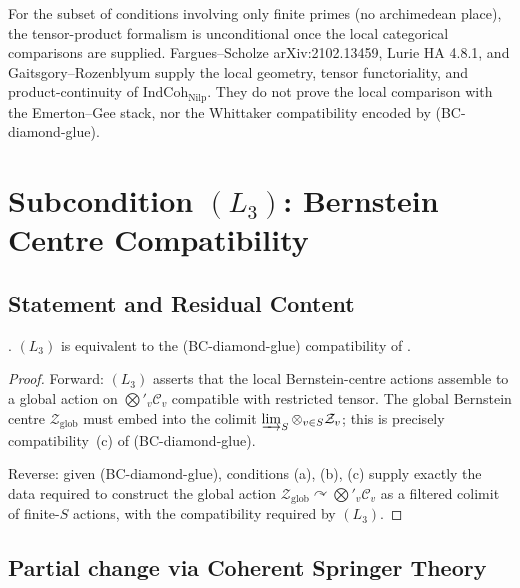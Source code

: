 \begin{remark}
\label{v4-arith:acd:rem:L2-finite-unconditional}
For the subset of conditions involving only finite primes (no
archimedean place), the tensor-product formalism is unconditional
once the local categorical comparisons are supplied. Fargues--Scholze
arXiv:2102.13459, Lurie HA 4.8.1, and Gaitsgory--Rozenblyum supply
the local geometry, tensor functoriality, and product-continuity of
\(\mathrm{IndCoh}_{\mathrm{Nilp}}\). They do not prove the local
comparison with the Emerton--Gee stack, nor the Whittaker
compatibility encoded by (BC-diamond-glue).
\end{remark}

\section{Subcondition \((L_{3})\): Bernstein Centre Compatibility}
\label{v4-arith:acd:L3}

\subsection{Statement and Residual Content}

\begin{theorem}
\label{v4-arith:acd:thm:L3-is-bc-diamond-glue}
\ClaimStatusProvedHere. \((L_{3})\) is equivalent to the
(BC-diamond-glue) compatibility of
.
\end{theorem}

\begin{proof}
Forward: \((L_{3})\) asserts that the local Bernstein-centre actions
assemble to a global action on \(\bigotimes'_{v}\mathcal{C}_{v}\)
compatible with restricted tensor. The global Bernstein centre
\(\mathcal{Z}_{\mathrm{glob}}\) must embed into the colimit
\(\varinjlim_{S}\otimes_{v\in S}\mathcal{Z}_{v}\); this is precisely
compatibility~(c) of (BC-diamond-glue).

Reverse: given (BC-diamond-glue), conditions (a), (b), (c) supply
exactly the data required to construct the global action
\(\mathcal{Z}_{\mathrm{glob}}\curvearrowright\bigotimes'_{v}\mathcal{C}_{v}\)
as a filtered colimit of finite-\(S\) actions, with the compatibility
required by \((L_{3})\).
\end{proof}

\subsection{Partial change via Coherent Springer Theory}

